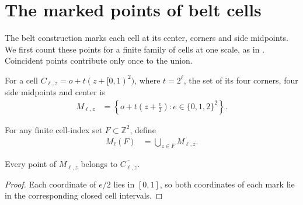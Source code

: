 \section{The marked points of belt cells}
\label{sec:area_law_belt_marks}

The belt construction marks each cell at its center, corners and side
midpoints. We first count these points for a finite family of cells
at one scale, as in \cite[Section~11]{OpenAI2026AreaLaw}.
Coincident points contribute only once to the union.


\begin{definition}
    \label{def:area_law_belt_cell_marks}
    \leanok
    For a cell $C_{\ell,z}=o+t(z+[0,1)^2)$, where $t=2^\ell$, the set of
    its four corners, four side midpoints and center is
    \begin{align}
        M_{\ell,z}
         & =\left\{o+t\left(z+\frac e2\right):
        e\in\{0,1,2\}^2\right\}.
    \end{align}
\end{definition}

\begin{definition}
    \label{def:area_law_belt_marks}
    \leanok
    For any finite cell-index set $F\subset\mathbb Z^2$, define
    \begin{align}
        M_\ell(F) & =\bigcup_{z\in F}M_{\ell,z}.
    \end{align}
\end{definition}

\begin{lemma}
    \label{thm:area_law_belt_marks_closed_cell}
    \leanok
    Every point of $M_{\ell,z}$ belongs to $\overline{C_{\ell,z}}$.
\end{lemma}
\begin{proof}\leanok
    Each coordinate of $e/2$ lies in $[0,1]$, so both coordinates
    of each mark lie in the corresponding closed cell intervals.
\end{proof}


